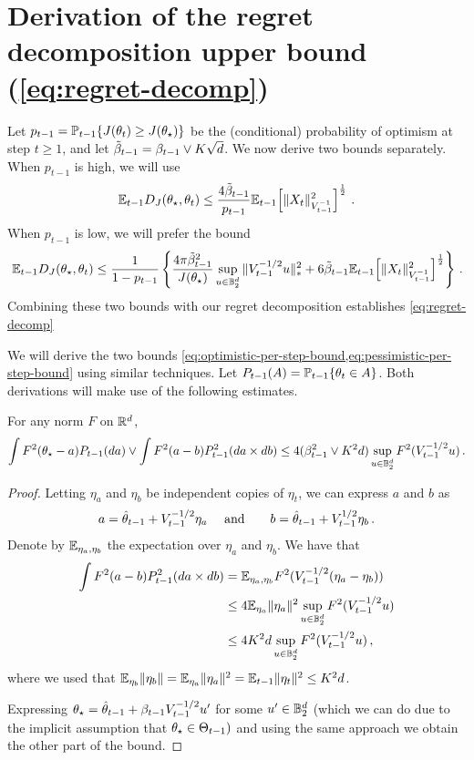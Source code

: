 \section{Derivation of the regret decomposition upper bound (\cref{eq:regret-decomp})} \label{sec:per-step-bounds}

Let $p_{t-1} = \mathbb{P}_{t-1}\{J(\theta_t) \geq J(\theta_\star)\}$ be the (conditional) probability of optimism at step $t \geq 1$, and let $\tilde{\beta}_{t-1} = \beta_{t-1} \vee K\sqrt{d}$. We now derive two bounds separately. When $p_{t-1}$ is high, we will use
\begin{equation}
  \mathbb{E}_{t-1} D_{J}(\theta_\star, \theta_t) \leq \frac{4\tilde{\beta}_{t-1} }{p_{t-1}} \mathbb{E}_{t-1}\!\left[\|X_t\|_{V_{t-1}^{-1}}^2\right]^{\frac{1}{2}}\,. \label{eq:optimistic-per-step-bound}
\end{equation}
When $p_{t-1}$ is low, we will prefer the bound
\begin{equation}
  \mathbb{E}_{t-1} D_{J}(\theta_\star, \theta_t) \leq \frac{1}{1-p_{t-1}} \left\{ \frac{4\pi\tilde{\beta}_{t-1}^2}{J(\theta_\star)}  \sup_{u \in \mathbb{B}^d_2} \|V_{t-1}^{-1/2} u\|_{*}^2 + 6\tilde{\beta}_{t-1} \mathbb{E}_{t-1}\!\left[\|X_t\|_{V_{t-1}^{-1}}^2\right]^{\frac{1}{2}} \right\}\,. \label{eq:pessimistic-per-step-bound}
\end{equation}
Combining these two bounds with our regret decomposition establishes \cref{eq:regret-decomp}

We will derive the two bounds \cref{eq:optimistic-per-step-bound,eq:pessimistic-per-step-bound} using similar techniques. Let $P_{t-1}(A) = \mathbb{P}_{t-1}\{\theta_t \in A\}$. Both derivations will make use of the following estimates.

\begin{claim}\label{claim:norm-integral}
  For any norm $F$ on $\mathbb{R}^d$,
  \begin{equation*}
    \int F^2(\theta_\star - a) P_{t-1}(da) \vee \int F^2(a - b) P_{t-1}^2(da \times db)\leq 4 (\beta_{t-1}^2 \vee K^2 d) \sup_{u \in \mathbb{B}^d_2}F^2(V_{t-1}^{-1/2}u)\,. \label{eq:norm-estimates}
  \end{equation*}
\end{claim}

\begin{proof}
  Letting $\eta_a$ and $\eta_b$ be independent copies of $\eta_t$, we can express $a$ and $b$ as
  $$
    a = \hat\theta_{t-1} + V_{t-1}^{-1/2} \eta_a\  \quad\text{and}\quad \quad b = \hat\theta_{t-1} + V_{t-1}^{1/2} \eta_b\,.
  $$
  Denote by $\mathbb{E}_{\eta_a, \eta_b}$ the expectation over $\eta_a$ and $\eta_b$. We have that
  \begin{align*}
    \int F^2(a-b) P_{t-1}^2(da \times db) 
      &= \mathbb{E}_{\eta_a,\eta_b} F^2(V_{t-1}^{-1/2}(\eta_a - \eta_b)) \\
      &\leq 4 \mathbb{E}_{\eta_a} \|\eta_a\|^2 \sup_{u \in \mathbb{B}^d_2} F^2(V_{t-1}^{-1/2}u) \\
      &\leq 4 K^2 d \sup_{u \in \mathbb{B}^d_2} F^2(V_{t-1}^{-1/2}u)\,,
  \end{align*}
  where we used that $\mathbb{E}_{\eta_b} \|\eta_b\|=\mathbb{E}_{\eta_a} \|\eta_a\|^2 = \mathbb{E}_{t-1} \|\eta_t\|^2 \leq K^2 d$. 
  
  Expressing $\theta_\star = \hat\theta_{t-1} + \beta_{t-1} V_{t-1}^{-1/2} u'$ for some $u' \in \mathbb{B}^d_2$ (which we can do due to the implicit assumption that $\theta_\star \in \Theta_{t-1})$ and using the same approach we obtain the other part of the bound. 
\end{proof}

